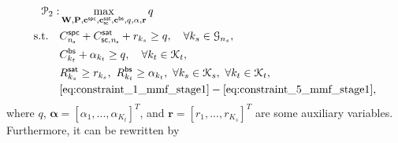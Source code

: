 \documentclass[draftclsnofoot, onecolumn, comsoc, 12pt]{IEEEtran}
\begin{document}
\begin{align} \label{eq:mmf_stage2}
\mathcal{P}_{2}:
&\mathop{{\text{max}}}_{{\bf{W}}, {\bf{P}}, {\bf{c}}^{\sf{spc}}, {\bf{c}}_{\sf{sc}}^{\sf{sat}}, {\bf{c}}^{\sf{bs}}, q, \bf{\alpha}, \bf{r}} q\\
 {\text{s.t.}} \quad
&C^{\sf{spc}}_ {\it{n_{s}}} + C_{\sf{sc}, \it{n_{s}}}^{\sf{sat}} + r_{k_{s}} \geq q, \quad 
\forall k_{s} \in \mathcal{G}_{n_{s}},
\label{eq:constraint_1_mmf_stage2}  \\
&C_{k_{t}}^{\sf{bs}} + \alpha_{k_{t}} \geq q, \quad \forall k_{t} \in \mathcal{K}_{t},
\label{eq:constraint_2_mmf_stage2}  \\
&R_{k_{s}}^{\sf{sat}} \geq r_{k_{s}}, \ R_{k_{t}}^{\sf{bs}} \geq \alpha_{k_{t}}, \ \forall k_{s} \in \mathcal{K}_{s}, \ \forall k_{t} \in \mathcal{K}_{t},
\label{eq:constraint_3_mmf_stage2}  \\
& \eqref{eq:constraint_1_mmf_stage1}  - \eqref{eq:constraint_5_mmf_stage1}, \nonumber
\end{align}
{where $q$, $\mathbf{\alpha} = \left[\alpha_{1},...,\alpha_{K_{t}}\right]^{T}$, and $\mathbf{r} = \left[r_{1},...,r_{K_{s}}\right]^{T}$ are some auxiliary variables. 
Furthermore, it can be rewritten by}
\end{document}
